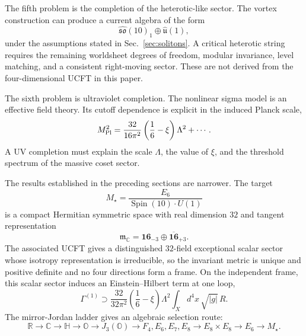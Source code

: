 \documentclass[aps,prd,preprint,longbibliography,nofootinbib,superscriptaddress,floatfix]{revtex4-2}
\newcommand{\Spin}{\operatorname{Spin}}
\begin{document}
The fifth problem is the completion of the heterotic-like sector. The vortex
construction can produce a current algebra of the form
\begin{equation}
    \widehat{\mathfrak{so}}(10)_1
    \oplus
    \widehat{\mathfrak u}(1),
    \label{eq:open_current_algebra}
\end{equation}
under the assumptions stated in Sec.~\ref{sec:solitons}. A critical heterotic
string requires the remaining worldsheet degrees of freedom, modular
invariance, level matching, and a consistent right-moving sector. These are not
derived from the four-dimensional UCFT in this paper.

The sixth problem is ultraviolet completion. The nonlinear sigma model is an
effective field theory. Its cutoff dependence is explicit in the induced
Planck scale,
\begin{equation}
    M_{\rm Pl}^2
    =
    \frac{32}{16\pi^2}
    \left(\frac16-\xi\right)\Lambda^2
    +
    \cdots .
    \label{eq:open_planck_relation}
\end{equation}
A UV completion must explain the scale \(\Lambda\), the value of \(\xi\), and
the threshold spectrum of the massive coset sector.

The results established in the preceding sections are narrower. The target
\begin{equation}
    M_\star
    =
    \frac{E_6}{\Spin(10)\cdot U(1)}
    \label{eq:conclusion_target}
\end{equation}
is a compact Hermitian symmetric space with real dimension \(32\) and tangent
representation
\begin{equation}
    \mathfrak m_{\mathbb C}
    =
    \mathbf{16}_{-3}
    \oplus
    \overline{\mathbf{16}}_{+3}.
    \label{eq:conclusion_tangent}
\end{equation}
The associated UCFT gives a distinguished \(32\)-field exceptional scalar
sector whose isotropy representation is irreducible, so the invariant metric is
unique and positive definite and no four directions form a frame. On the
independent frame, this scalar sector induces an Einstein--Hilbert term at one
loop,
\begin{equation}
    \Gamma^{(1)}
    \supset
    \frac{32}{32\pi^2}
    \left(\frac16-\xi\right)
    \Lambda^2
    \int_X d^4x\,\sqrt{|g|}\,R .
    \label{eq:conclusion_induced_R}
\end{equation}
The mirror-Jordan ladder gives an algebraic selection route:
\begin{equation}
    \mathbb R
    \to
    \mathbb C
    \to
    \mathbb H
    \to
    \mathbb O
    \to
    J_3(\mathbb O)
    \to
    F_4,E_6,E_7,E_8
    \to
    E_8\times E_8
    \to
    E_6
    \to
    M_\star .
    \label{eq:conclusion_selection_chain}
\end{equation}
\end{document}
